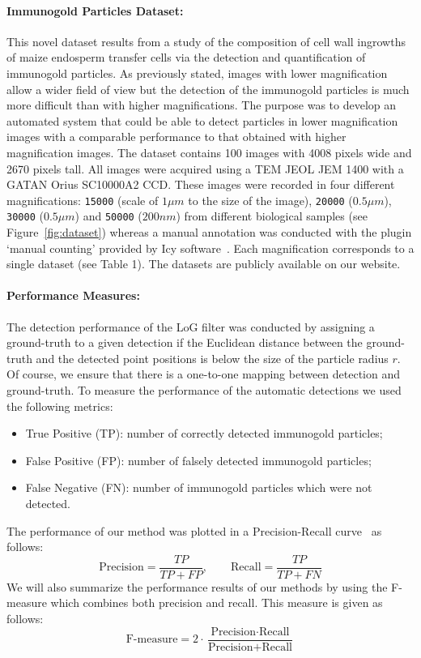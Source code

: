 \documentclass[a4paper,11pt]{article}
\newcommand{\1}{\mathbbm{1}}
\newcommand{\fref}[1]{Figure~\ref{#1}}
\newcommand{\db}[1]{\texttt{#1}}
\theoremstyle{plain}
\begin{document}
\paragraph{Immunogold Particles Dataset:}
This novel dataset results from a study of the composition of cell wall ingrowths of maize endosperm transfer cells via the detection and quantification of immunogold particles. As previously stated, images with lower magnification allow a wider field of view but the detection of the immunogold particles is much more difficult than with higher magnifications. The purpose was to develop an automated system that could be able to detect particles in lower magnification images with a comparable performance to that obtained with higher magnification images. The dataset contains 100 images with 4008 pixels wide and 2670 pixels tall. All images were acquired using a \acf{TEM} JEOL JEM 1400 with a GATAN Orius SC10000A2 CCD. These images were recorded in four different magnifications: \db{15000} (scale of $1\mu m$ to the size of the image), \db{20000} ($0.5\mu m$), \db{30000} ($0.5\mu m$) and \db{50000} ($200 nm$) from different biological samples (see \fref{fig:dataset}) whereas a manual annotation was conducted with the plugin `manual counting' provided by Icy software~\cite{de2012icy}. Each magnification corresponds to a single dataset (see Table 1). The datasets are publicly available on our website.

\paragraph{Performance Measures:}
The detection performance of the \ac{LoG} filter was conducted by assigning a ground-truth to a given detection if the Euclidean distance between the ground-truth and the detected point positions is below the size of the particle radius $r$. Of course, we ensure that there is a one-to-one mapping between detection and ground-truth. To measure the performance of the automatic detections we used the following metrics:
\begin{itemize}
\item True Positive (TP): number of correctly detected immunogold particles;
\item False Positive (FP): number of falsely detected immunogold particles;
\item False Negative (FN): number of immunogold particles which were not detected.
\end{itemize}
The performance of our method was plotted in a Precision-Recall curve~\cite{davis2006} as follows:
\begin{equation}
   \text{Precision}  = \frac{TP}{TP+FP}, \qquad  \text{Recall} = \frac{TP}{TP+FN}
\label{eq:prec_rec}
\end{equation}
We will also summarize the performance results of our methods by using the F-measure which combines both precision and recall. This measure is given as follows:
\begin{equation}
   \text{F-measure}  = 2 \cdot \frac{\text{Precision} \cdot \text{Recall}}{\text{Precision}+\text{Recall}}
\label{eq:prec_rec1}
\end{equation}
\end{document}
